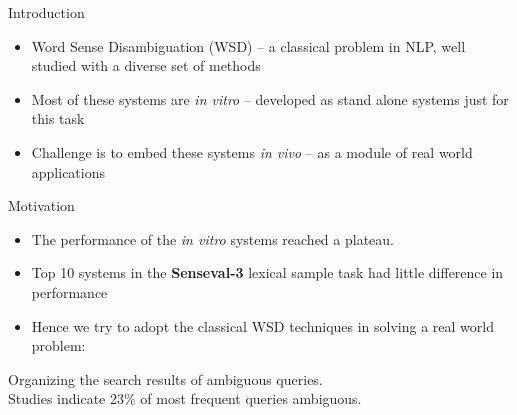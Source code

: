 \documentclass{beamer}
\begin{document}

\begin{frame}{Introduction}
  \begin{itemize}
  \item Word Sense Disambiguation (WSD) -- a classical problem in NLP, well studied with a diverse set of methods
  \item Most of these systems are {\it in vitro} -- developed as stand alone systems just for this task 
  \item Challenge is to embed these systems {\it in vivo} -- as a module of real world applications 
  \end{itemize}
\end{frame}

\begin{frame}{Motivation}
  \begin{itemize}
    \item The performance of the {\it in vitro} systems reached a plateau.
    \item Top 10 systems in the {\bf Senseval-3} lexical sample task had little difference in performance
    \item Hence we try to adopt the classical WSD techniques in solving a real world problem:
  \end{itemize}
  \begin{center}
    Organizing the search results of ambiguous queries. \\
   Studies indicate 23\% of most frequent queries ambiguous.
  \end{center}
\end{frame}
\end{document}
